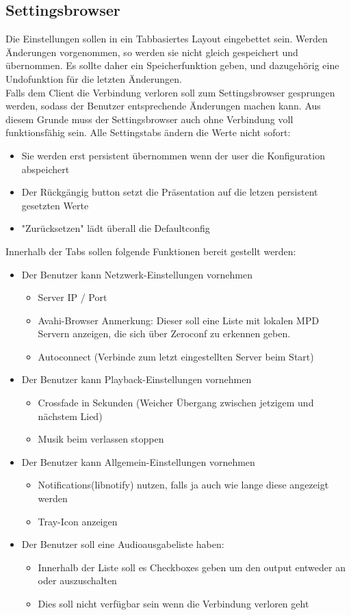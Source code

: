 \subsection{Settingsbrowser}
Die Einstellungen sollen in ein Tabbasiertes Layout eingebettet sein. 
Werden Änderungen vorgenommen, so werden sie nicht gleich gespeichert und übernommen. 
Es sollte daher ein Speicherfunktion geben, und dazugehörig eine Undofunktion für die letzten Änderungen.
\\
Falls dem Client die Verbindung verloren soll zum Settingsbrowser gesprungen werden, sodass der Benutzer entsprechende
Änderungen machen kann. Aus diesem Grunde muss der Settingsbrowser auch ohne Verbindung voll funktionsfähig sein.
Alle Settingstabs ändern die Werte nicht sofort:
\begin{itemize} 
   \item Sie werden erst persistent übernommen wenn der user die Konfiguration abspeichert
   \item Der Rückgängig button setzt die Präsentation auf die letzen persistent gesetzten Werte
   \item "Zurücksetzen" lädt überall die Defaultconfig
\end{itemize}
Innerhalb der Tabs sollen folgende Funktionen bereit gestellt werden:
\begin{itemize}
	\item Der Benutzer kann Netzwerk-Einstellungen vornehmen
	\begin{itemize}
		\item Server IP / Port
		\item Avahi-Browser
		      Anmerkung: Dieser soll eine Liste mit lokalen MPD Servern anzeigen,
		      die sich über Zeroconf zu erkennen geben. 
		\item Autoconnect (Verbinde zum letzt eingestellten Server beim Start)
	\end{itemize}
	\item Der Benutzer kann Playback-Einstellungen vornehmen	
	\begin{itemize}
		\item Crossfade in Sekunden (Weicher Übergang zwischen jetzigem und nächstem Lied)
		\item Musik beim verlassen stoppen
	\end{itemize}
	\item Der Benutzer kann Allgemein-Einstellungen vornehmen
	\begin{itemize}
		\item Notifications(libnotify) nutzen, falls ja auch wie lange diese angezeigt werden
		\item Tray-Icon anzeigen
	\end{itemize}
	\item Der Benutzer soll eine Audioausgabeliste haben:
	\begin{itemize}
		\item Innerhalb der Liste soll es Checkboxes geben um den output entweder an oder auszuschalten
		\item Dies soll nicht verfügbar sein wenn die Verbindung verloren geht
	\end{itemize}
\end{itemize}

